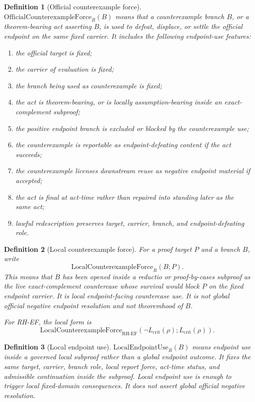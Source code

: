 \documentclass[11pt]{article}
\newtheorem{definition}{Definition}[section]
\newcommand{\Lcrit}{L_{\mathrm{crit}}}
\newcommand{\RH}{\mathrm{RH}}
\newcommand{\EF}{\mathrm{EF}}
\newcommand{\OfficialCxForce}{\mathrm{OfficialCounterexampleForce}}
\newcommand{\LocalCxForce}{\mathrm{LocalCounterexampleForce}}
\newcommand{\LocalEndpointUse}{\mathrm{LocalEndpointUse}}
\begin{document}
\begin{definition}[Official counterexample force]
\(\OfficialCxForce_R(B)\) means that a counterexample branch \(B\), or a theorem-bearing act asserting \(B\), is used to defeat, displace, or settle the official endpoint on the same fixed carrier. It includes the following endpoint-use features:
\begin{enumerate}
\item the official target is fixed;
\item the carrier of evaluation is fixed;
\item the branch being used as counterexample is fixed;
\item the act is theorem-bearing, or is locally assumption-bearing inside an exact-complement subproof;
\item the positive endpoint branch is excluded or blocked by the counterexample use;
\item the counterexample is reportable as endpoint-defeating content if the act succeeds;
\item the counterexample licenses downstream reuse as negative endpoint material if accepted;
\item the act is final at act-time rather than repaired into standing later as the same act;
\item lawful redescription preserves target, carrier, branch, and endpoint-defeating role.
\end{enumerate}
\end{definition}

\begin{definition}[Local counterexample force]
For a proof target \(P\) and a branch \(B\), write
\[
\LocalCxForce_R(B;P).
\]
This means that \(B\) has been opened inside a reductio or proof-by-cases subproof as the live exact-complement countercase whose survival would block \(P\) on the fixed endpoint carrier. It is local endpoint-facing countercase use. It is not global official negative endpoint resolution and not theoremhood of \(B\).

For RH-EF, the local form is
\[
\LocalCxForce_{\RH\text{-}\EF}(\neg\Lcrit(\rho);\Lcrit(\rho)).
\]
\end{definition}

\begin{definition}[Local endpoint use]
\(\LocalEndpointUse_R(B)\) means endpoint use inside a governed local subproof rather than a global endpoint outcome. It fixes the same target, carrier, branch role, local report force, act-time status, and admissible continuation inside the subproof. Local endpoint use is enough to trigger local fixed-domain consequences. It does not assert global official negative resolution.
\end{definition}
\end{document}

